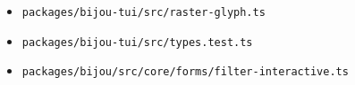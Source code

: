 \begin{itemize}
  \texttt{p\allowbreak{}a\allowbreak{}c\allowbreak{}k\allowbreak{}a\allowbreak{}g\allowbreak{}e\allowbreak{}s\allowbreak{}/\allowbreak{}b\allowbreak{}i\allowbreak{}j\allowbreak{}o\allowbreak{}u\allowbreak{}-\allowbreak{}t\allowbreak{}u\allowbreak{}i\allowbreak{}/\allowbreak{}s\allowbreak{}r\allowbreak{}c\allowbreak{}/\allowbreak{}p\allowbreak{}i\allowbreak{}p\allowbreak{}e\allowbreak{}l\allowbreak{}i\allowbreak{}n\allowbreak{}e\allowbreak{}/\allowbreak{}m\allowbreak{}i\allowbreak{}d\allowbreak{}d\allowbreak{}l\allowbreak{}e\allowbreak{}w\allowbreak{}a\allowbreak{}r\allowbreak{}e\allowbreak{}/\allowbreak{}s\allowbreak{}u\allowbreak{}r\allowbreak{}f\allowbreak{}a\allowbreak{}c\allowbreak{}e\allowbreak{}-\allowbreak{}s\allowbreak{}h\allowbreak{}a\allowbreak{}d\allowbreak{}e\allowbreak{}r\allowbreak{}s\allowbreak{}.\allowbreak{}t\allowbreak{}s}
\item
  \texttt{p\allowbreak{}a\allowbreak{}c\allowbreak{}k\allowbreak{}a\allowbreak{}g\allowbreak{}e\allowbreak{}s\allowbreak{}/\allowbreak{}b\allowbreak{}i\allowbreak{}j\allowbreak{}o\allowbreak{}u\allowbreak{}-\allowbreak{}t\allowbreak{}u\allowbreak{}i\allowbreak{}/\allowbreak{}s\allowbreak{}r\allowbreak{}c\allowbreak{}/\allowbreak{}r\allowbreak{}a\allowbreak{}s\allowbreak{}t\allowbreak{}e\allowbreak{}r\allowbreak{}-\allowbreak{}g\allowbreak{}l\allowbreak{}y\allowbreak{}p\allowbreak{}h\allowbreak{}.\allowbreak{}t\allowbreak{}s}
\item
  \texttt{p\allowbreak{}a\allowbreak{}c\allowbreak{}k\allowbreak{}a\allowbreak{}g\allowbreak{}e\allowbreak{}s\allowbreak{}/\allowbreak{}b\allowbreak{}i\allowbreak{}j\allowbreak{}o\allowbreak{}u\allowbreak{}-\allowbreak{}t\allowbreak{}u\allowbreak{}i\allowbreak{}/\allowbreak{}s\allowbreak{}r\allowbreak{}c\allowbreak{}/\allowbreak{}t\allowbreak{}y\allowbreak{}p\allowbreak{}e\allowbreak{}s\allowbreak{}.\allowbreak{}t\allowbreak{}e\allowbreak{}s\allowbreak{}t\allowbreak{}.\allowbreak{}t\allowbreak{}s}
\item
  \texttt{p\allowbreak{}a\allowbreak{}c\allowbreak{}k\allowbreak{}a\allowbreak{}g\allowbreak{}e\allowbreak{}s\allowbreak{}/\allowbreak{}b\allowbreak{}i\allowbreak{}j\allowbreak{}o\allowbreak{}u\allowbreak{}/\allowbreak{}s\allowbreak{}r\allowbreak{}c\allowbreak{}/\allowbreak{}c\allowbreak{}o\allowbreak{}r\allowbreak{}e\allowbreak{}/\allowbreak{}f\allowbreak{}o\allowbreak{}r\allowbreak{}m\allowbreak{}s\allowbreak{}/\allowbreak{}f\allowbreak{}i\allowbreak{}l\allowbreak{}t\allowbreak{}e\allowbreak{}r\allowbreak{}-\allowbreak{}i\allowbreak{}n\allowbreak{}t\allowbreak{}e\allowbreak{}r\allowbreak{}a\allowbreak{}c\allowbreak{}t\allowbreak{}i\allowbreak{}v\allowbreak{}e\allowbreak{}.\allowbreak{}t\allowbreak{}s}

\end{itemize}

